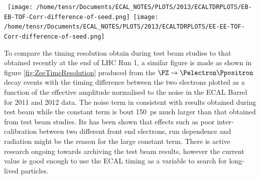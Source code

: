 \begin{center}
\centering
\mbox{
\texttt{[image: /home/tensr/Documents/ECAL\_NOTES/PLOTS/2013/ECALTDRPLOTS/EB-EB-TOF-Corr-difference-of-seed.png]}\quad
\texttt{[image: /home/tensr/Documents/ECAL\_NOTES/PLOTS/2013/ECALTDRPLOTS/EE-EE-TOF-Corr-difference-of-seed.png]}}
\label{fig:ZeeTimePerformance}
\end{center}
To compare the timing resolution obtain during test beam studies to that obtained recently at the end of LHC Run 1, a similar figure is made as shown in figure \ref{fig:ZeeTimeResolution} produced from the $\PZ \rightarrow \Pelectron \Ppositron$ decay events with the timing difference between the two electrons plotted as a function of the effective amplitude normalised to the noise in the ECAL Barrel for 2011 and 2012 data. The noise term in consistent with results obtained during test beam while the constant term is bout 150~ps much larger than that obtained from test beam studies. Its has been shown that effects such as poor inter-calibration between two different front end electrons, run dependence and radiation might be the reason for the  large constant term. There is active research ongoing towards archiving the test beam results, however the current value is good enough to use the ECAL timing as a variable to search for long-lived particles.
